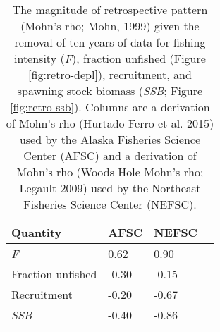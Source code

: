 
\begin{longtable}[t]{llll}
\caption{\label{tab:RetroMohnsrho}The magnitude of retrospective pattern (Mohn's rho; Mohn, 1999) given the removal of ten years of data for fishing intensity (\emph{F}), fraction unfished (Figure \ref{fig:retro-depl}),  recruitment, and spawning stock biomass (\emph{SSB}; Figure \ref{fig:retro-ssb}). Columns are a derivation of Mohn's rho (Hurtado-Ferro et al. 2015) used by the Alaska Fisheries Science Center (AFSC) and a derivation of Mohn's rho (Woods Hole Mohn's rho; Legault 2009) used by the Northeast Fisheries Science Center (NEFSC).}\\
\toprule
Quantity & AFSC & NEFSC\\
\midrule
\emph{F} & 0.62 & 0.90\\
Fraction unfished & -0.30 & -0.15\\
Recruitment & -0.20 & -0.67\\
\emph{SSB} & -0.40 & -0.86\\
\bottomrule
\end{longtable}
